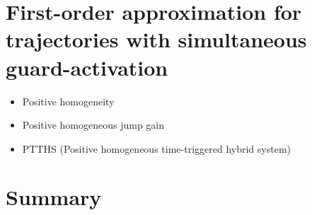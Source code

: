 \documentclass[../DC2017114Bouma.tex]{subfiles}
\begin{document}
\section{First-order approximation for trajectories with simultaneous guard-activation}
\begin{itemize}
\item Positive homogeneity
\item Positive homogeneous jump gain
\item PTTHS (Positive homogeneous time-triggered hybrid system)
\end{itemize}
%
%
%
%
%
%

\section{Summary}
\end{document}
